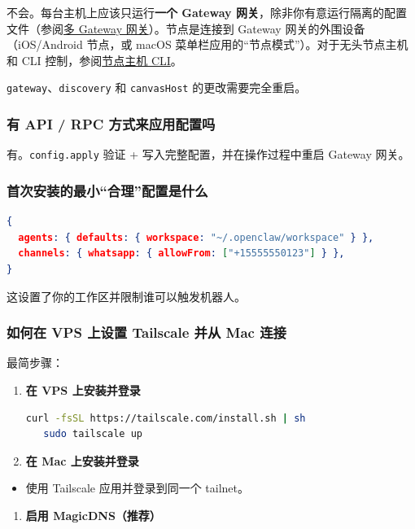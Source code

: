 不会。每台主机上应该只运行\textbf{一个 Gateway 网关}，除非你有意运行隔离的配置文件（参阅\href{/gateway/multiple-gateways}{多 Gateway 网关}）。节点是连接到 Gateway 网关的外围设备（iOS/Android 节点，或 macOS 菜单栏应用的“节点模式”）。对于无头节点主机和 CLI 控制，参阅\href{/cli/node}{节点主机 CLI}。

\texttt{gateway}、\texttt{discovery} 和 \texttt{canvasHost} 的更改需要完全重启。

\subsubsection{有 API / RPC 方式来应用配置吗}


有。\texttt{config.apply} 验证 + 写入完整配置，并在操作过程中重启 Gateway 网关。

\subsubsection{首次安装的最小“合理”配置是什么}


\begin{lstlisting}[language=json]
{
  agents: { defaults: { workspace: "~/.openclaw/workspace" } },
  channels: { whatsapp: { allowFrom: ["+15555550123"] } },
}
\end{lstlisting}


这设置了你的工作区并限制谁可以触发机器人。

\subsubsection{如何在 VPS 上设置 Tailscale 并从 Mac 连接}


最简步骤：

\begin{enumerate}
  \item \textbf{在 VPS 上安装并登录}
\begin{lstlisting}[language=bash]
   curl -fsSL https://tailscale.com/install.sh | sh
   sudo tailscale up
\end{lstlisting}

  \item \textbf{在 Mac 上安装并登录}
\end{enumerate}

\begin{itemize}
  \item 使用 Tailscale 应用并登录到同一个 tailnet。
\end{itemize}

\begin{enumerate}
  \item \textbf{启用 MagicDNS（推荐）}
\end{enumerate}

